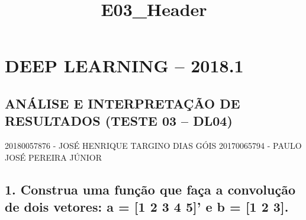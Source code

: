 \documentclass[11pt]{article}
\title{E03\_Header}
\begin{document}
    
    
    \maketitle
    
    

    
    \hypertarget{deep-learning-2018.1}{%
\section{ DEEP LEARNING -- 2018.1 }\label{deep-learning-2018.1}}

\hypertarget{anuxe1lise-e-interpretauxe7uxe3o-de-resultados-teste-03-dl04}{%
\subsection{ANÁLISE E INTERPRETAÇÃO DE RESULTADOS (TESTE 03 --
DL04)}\label{anuxe1lise-e-interpretauxe7uxe3o-de-resultados-teste-03-dl04}}

20180057876 - JOSÉ HENRIQUE TARGINO DIAS GÓIS 20170065794 - PAULO JOSÉ
PEREIRA JÚNIOR 

    \hypertarget{construa-uma-funuxe7uxe3o-que-fauxe7a-a-convoluuxe7uxe3o-de-dois-vetores-a-1-2-3-4-5-e-b-1-2-3.}{%
\subsection{1. Construa uma função que faça a convolução de dois
vetores: a = {[}1 2 3 4 5{]}' e b = {[}1 2
3{]}.}\label{construa-uma-funuxe7uxe3o-que-fauxe7a-a-convoluuxe7uxe3o-de-dois-vetores-a-1-2-3-4-5-e-b-1-2-3.}}
\end{document}
